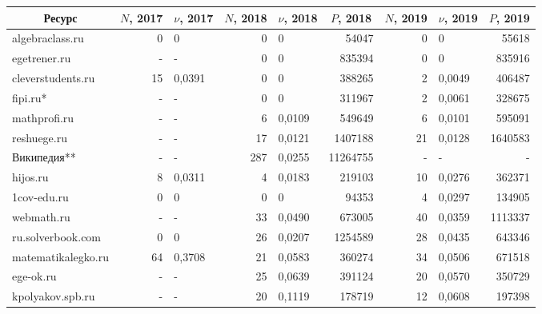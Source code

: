 {\footnotesize
\begin{landscape}
\begin{tabular}{|l|r|l|r|l|r|r|l|r|}
\hline
	\multicolumn{1}{|c|}{Ресурс}
  & \multicolumn{1}{|c|}{$N$, 2017}
  & \multicolumn{1}{|c|}{$\nu$, 2017}%
  & \multicolumn{1}{|c|}{$N$, 2018}%
  & \multicolumn{1}{|c|}{$\nu$, 2018}%
  & \multicolumn{1}{|c|}{$P$, 2018}%
  & \multicolumn{1}{|c|}{$N$, 2019}%
  & \multicolumn{1}{|c|}{$\nu$, 2019}%
  & \multicolumn{1}{|c|}{$P$, 2019}%
  \\
\hline
algebraclass.ru      &     0  & 0      &   0  & 0      &    54047  &    0  &  0       &    55618  \\
egetrener.ru         &     -  & -      &   0  & 0      &   835394  &    0  &  0       &   835916  \\
cleverstudents.ru    &    15  & 0,0391 &   0  & 0      &   388265  &    2  &  0,0049  &   406487  \\
fipi.ru*             &     -  & -      &   0  & 0      &   311967  &    2  &  0,0061  &   328675  \\
mathprofi.ru         &     -  & -      &   6  & 0,0109 &   549649  &    6  &  0,0101  &   595091  \\
reshuege.ru          &     -  & -      &  17  & 0,0121 &  1407188  &   21  &  0,0128  &  1640583  \\
Википедия**          &     -  & -      & 287  & 0,0255 & 11264755  &    -  &  -       &        -  \\
hijos.ru             &     8  & 0,0311 &   4  & 0,0183 &   219103  &   10  &  0,0276  &   362371  \\
1cov-edu.ru          &     0  & 0      &   0  & 0      &    94353  &    4  &  0,0297  &   134905  \\
webmath.ru           &     -  & -      &  33  & 0,0490 &   673005  &   40  &  0,0359  &  1113337  \\
ru.solverbook.com    &     0  & 0      &  26  & 0,0207 &  1254589  &   28  &  0,0435  &   643346  \\
matematikalegko.ru   &    64  & 0,3708 &  21  & 0,0583 &   360274  &   34  &  0,0506  &   671518  \\
ege-ok.ru            &     -  & -      &  25  & 0,0639 &   391124  &   20  &  0,0570  &   350729  \\
kpolyakov.spb.ru     &     -  & -      &  20  & 0,1119 &   178719  &   12  &  0,0608  &   197398  \\

\end{tabular}
\end{landscape}}
